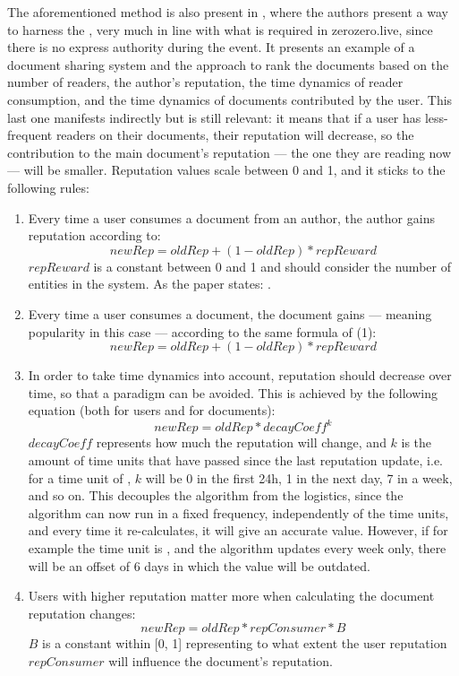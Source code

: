 The aforementioned method is also present in \cite{Daly2009}, where the authors present a way to harness the , very much in line with what is required in zerozero.live, since there is no express authority during the event. It presents an example of a document sharing system and the approach to rank the documents based on the number of readers, the author's reputation, the time dynamics of reader consumption, and the time dynamics of documents contributed by the user. This last one manifests indirectly but is still relevant: it means that if a user has less-frequent readers on their documents, their reputation will decrease, so the contribution to the main document's reputation --- the one they are reading now --- will be smaller.
Reputation values scale between 0 and 1, and it sticks to the following rules:
\begin{enumerate}
    \item Every time a user consumes a document from an author, the author gains reputation according to:
    \[newRep = oldRep + (1 - oldRep) * repReward\]
    $repReward$ is a constant between 0 and 1 and should consider the number of entities in the system. As the paper states: .
    \item Every time a user consumes a document, the document gains  --- meaning popularity in this case --- according to the same formula of (1):
    \[newRep = oldRep + (1 - oldRep) * repReward\]
    \item In order to take time dynamics into account, reputation should decrease over time, so that a  paradigm can be avoided. This is achieved by the following equation (both for users and for documents):
    \[newRep = oldRep * decayCoeff^k\]
    $decayCoeff$ represents how much the reputation will change, and $k$ is the amount of time units that have passed since the last reputation update, i.e. for a time unit of , $k$ will be 0 in the first 24h, 1 in the next day, 7 in a week, and so on. This decouples the algorithm from the logistics, since the algorithm can now run in a fixed frequency, independently of the time units, and every time it re-calculates, it will give an accurate value. However, if for example the time unit is , and the algorithm updates every week only, there will be an offset of 6 days in which the value will be outdated.
    \item Users with higher reputation matter more when calculating the document reputation changes:
    \[newRep = oldRep * repConsumer * B\]
    $B$ is a constant within [0, 1] representing to what extent the user reputation $repConsumer$ will influence the document's reputation.


\end{enumerate}
